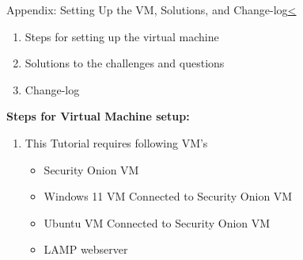 \documentclass[12pt]{article}
\newenvironment{instructionblock}{\Large\bgroup}{\egroup}
\newcommand{\ben}{\begin{enumerate}}
\newcommand{\een}{\end{enumerate}}
\newcommand{\ei}{\end{itemize}}
\begin{document}
%
%
\begin{slide}{Appendix: Setting Up the VM, Solutions, and Change-log}{\hyperref[slide 26]{\textless}}
	\begin{instructionblock}
		\begin{enumerate}
			\item {Steps for setting up the virtual machine}
			\item {Solutions to the challenges and questions}
				
			\item {Change-log}
		\end{enumerate}
	\end{instructionblock}
\end{slide}

\textbf{Steps for Virtual Machine setup:}

\ben
\item This Tutorial requires following VM's
\begin{itemize}
    \item Security Onion VM
	\item Windows 11 VM Connected to Security Onion VM
	\item Ubuntu VM Connected to Security Onion VM
    \item LAMP webserver
    
	
\end{itemize}
\een
\end{document}
